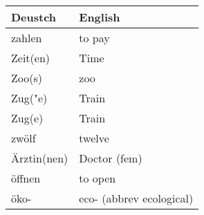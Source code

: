 \documentclass{article}
\renewcommand{\arraystretch}{1}
\begin{document}
\hfill
\begin{minipage}{0.48\textwidth}
    \centering
    \renewcommand{\arraystretch}{1.5}
    \begin{tabular}{|>{\raggedright\arraybackslash}p{3.5cm}|>{\raggedright\arraybackslash}p{3.5cm}|}
        \hline
        \rowcolor{gray!20} \textbf{Deustch} & \textbf{English} \\
        \hline
        zahlen & to pay \\\hline
        Zeit(en) & Time \\\hline
        Zoo(s) &  zoo \\\hline
        Zug("e) & Train \\\hline
        Zug(e) & Train \\\hline
        zwölf & twelve \\\hline
        Ärztin(nen) & Doctor (fem) \\\hline
        öffnen & to open \\\hline
        öko- & eco- (abbrev ecological) \\\hline
    \end{tabular}
\end{minipage}
\end{document}
